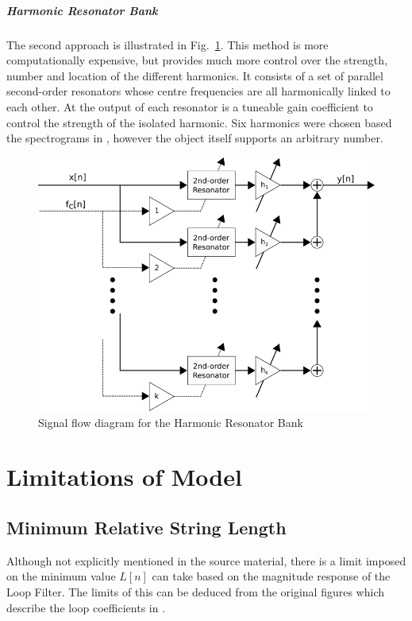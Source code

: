 \documentclass[../main.tex]{subfiles}
\begin{document}
\subparagraph{Harmonic Resonator Bank}
The second approach is illustrated in Fig.~\ref{fig:HRB}. This method is more computationally expensive, but provides much more control over the strength, number and location of the different harmonics. It consists of a set of parallel second-order resonators whose centre frequencies are all harmonically linked to each other. At the output of each resonator is a tuneable gain coefficient to control the strength of the isolated harmonic. Six harmonics were chosen based the spectrograms in , however the object itself supports an arbitrary number.

\begin{figure}[h]
    \centering
    \includegraphics[scale=.5]{./images/diagrams/HarmonicResonatorBank.png}
    \caption{Signal flow diagram for the Harmonic Resonator Bank}
    \label{fig:HRB}
\end{figure}

\section{Limitations of Model}
\subsection{Minimum Relative String Length}
\label{sec:MinL}
Although not explicitly mentioned in the source material, there is a limit imposed on the minimum value $L[n]$ can take based on the magnitude response of the Loop Filter. The limits of this can be deduced from the original figures which describe the loop coefficients in .
\end{document}
